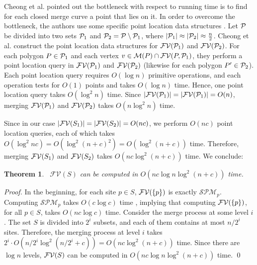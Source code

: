 \documentclass[11pt]{llncs}
\newtheorem{Theorem}{Theorem}
\newcommand{\SPM}{\ensuremath{\mathcal{SPM}}}
\newcommand{\FV}{\ensuremath{\mathcal{FV}}}
\begin{document}
Cheong et al. \cite{CEGGHLLN-11} pointed out
the bottleneck with respect to running time is to find for each closed merge curve
a point that lies on it.
In order to overcome the bottleneck,
the authors use some specific point location data structures
\cite{EGS-86,Mulmuley-90}.
Let ${\cal P}$ be divided into two sets ${\cal P}_1$ and  ${\cal P}_2={\cal P}\setminus {\cal P}_1$,
where $|{\cal P}_1|\approx |{\cal P}_2|\approx \frac{n}{2}$.
Cheong et al. \cite{CEGGHLLN-11} construct the point location data structures for ${\cal FV}({\cal P}_1)$ and ${\cal FV}({\cal P}_2)$.
For each polygon $P \in {\cal P}_1$ and each vertex $v \in {\cal M}(P)\cap{\cal FV}(P,{\cal P}_1)$,
they perform a point location query in ${\cal FV}({\cal P}_1)$  and ${\cal FV}({\cal P}_2)$ (likewise for each polygon $P' \in {\cal P}_2$).
Each point location query requires $O(\log n)$ primitive operations,
and each operation tests for $O(1)$ points and takes $O(\log n)$ time.
Hence, one point location query takes $O(\log^2 n)$ time.
Since $|{\cal FV}({\cal P}_1)|=|{\cal FV}({\cal P}_1)|=O(n)$,
merging ${\cal FV}({\cal P}_1)$ and ${\cal FV}({\cal P}_2)$
takes $O(n\log^2 n)$ time.


Since in our case
$|{\cal FV}(S_1)|=|{\cal FV}(S_2)|=O(nc)$,
we perform $O(nc)$ point location queries,
each of which takes $O(\log^2{nc})= O(\log^2(n+c)^2)=O(\log^2{(n+c)})$ time.
Therefore,
merging ${\cal FV}(S_1)$ and ${\cal FV}(S_2)$
takes $O(nc\log^2 (n+c))$ time.
We conclude:

\newcommand{\thmfarthesttimetext}{$\FV(S)$ can be computed in $O(nc\log n\log^2(n+c))$ time.
}

\begin{Theorem}~\label{thm-farthest-time}
\thmfarthesttimetext
\end{Theorem}

\begin{proof}
In the beginning, for each site $p\in S$,
${\cal FV}(\{p\})$ is exactly $\SPM_p$.
Computing $\SPM_p$ takes $O(c\log c)$ time \cite{BKC-09},
implying that computing ${\cal FV}(\{p\})$, for all $p \in S$, takes $O(nc\log c)$ time.
Consider the merge process at some level $i$.
The set $S$ is divided into $2^i$ subsets,
and each of them contains at most $n/2^i$ sites.
Therefore, the merging process at level $i$
takes $2^i\cdot O(n/2^i\log^2 (n/2^i+c))=O(nc\log^2 (n+c))$ time.
Since there are $\log n$ levels,
${\cal FV}(S)$ can be computed in $O(nc\log n\log^2(n+c))$ time.
\qed
\end{proof}
\end{document}
